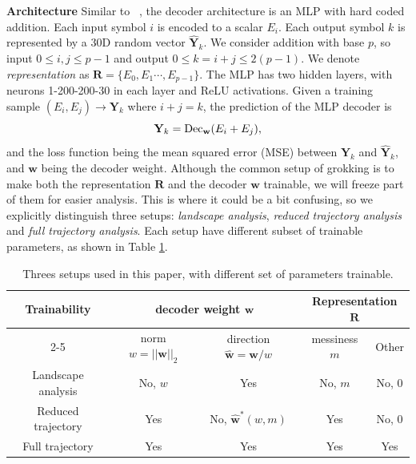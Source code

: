 \documentclass{article} %
\newcommand{\mat}[1]{\mathbf{#1}}
\begin{document}
{\bf Architecture} Similar to ~\cite{liu2022towards}, the decoder architecture is an MLP with hard coded addition. Each input symbol $i$ is encoded to a scalar $E_i$. Each output symbol $k$ is represented by a 30D random vector $\hat{\mat{Y}}_k$. We consider addition with base $p$, so input $0\leq i,j\leq p-1$ and output $0\leq k=i+j\leq 2(p-1)$. We denote \textit{representation} as $\mat{R}=\{E_0,E_1\cdots, E_{p-1}\}$. The MLP has two hidden layers, with neurons 1-200-200-30 in each layer and ReLU activations. Given a training sample $(E_i,E_j)\to \mat{Y}_k$ where $i+j=k$, the prediction of the MLP decoder is 
\begin{equation}
    \mat{Y}_k = {\rm Dec}_{\mat{w}}(E_i+E_j),
\end{equation}
and the loss function being the mean squared error (MSE) between $\mat{Y}_k$ and $\hat{\mat{Y}}_k$, and $\mat{w}$ being the decoder weight. Although the common setup of grokking is to make both the representation $\mat{R}$ and the decoder $\mat{w}$ trainable, we will freeze part of them for easier analysis. This is where it could be a bit confusing, so we explicitly distinguish three setups: \textit{landscape analysis}, \textit{reduced trajectory analysis} and \textit{full trajectory analysis}. Each setup have different subset of trainable parameters, as shown in Table \ref{tab:setups}.

\begin{table}[]
    \centering
    \begin{tabular}{|c|c|c|c|c|}\hline
    \multirow{2}{*}{Trainability}  &  \multicolumn{2}{c|}{decoder weight $\mat{w}$}  & \multicolumn{2}{c|}{Representation $\mat{R}$}   \\\cline{2-5}
     & norm $w=||\mat{w}||_2$ & direction $\hat{\mat{w}}=\mat{w}/w$ & messiness $m$ & Other  \\\hline
    Landscape analysis & No, $w$ & Yes & No, $m$ & No, 0 \\\hline
    Reduced trajectory & Yes & No, $\hat{\mat{w}}^*(w,m)$ & Yes & No, 0 \\\hline
    Full trajectory & Yes & Yes & Yes & Yes \\\hline
    \end{tabular}
    \caption{Threes setups used in this paper, with different set of parameters trainable.}
    \label{tab:setups}
\end{table}
\end{document}
